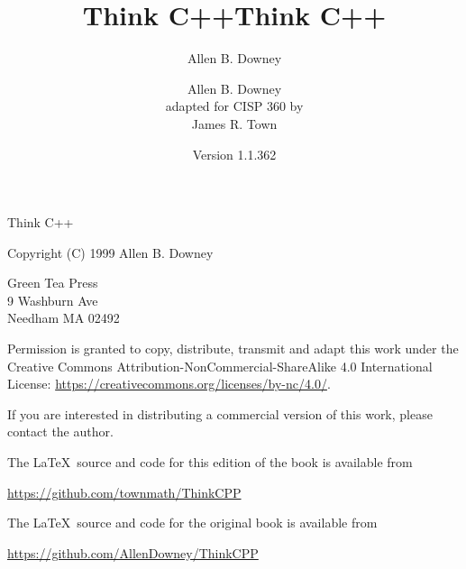 \documentclass{book}
\title{Think C++}
\author{Allen B. Downey}
\date{}
\begin{document}
\title {Think C++}
\author {Allen B. Downey \\ adapted for CISP 360 by \\ James R. Town}
\date {Version 1.1.362}
\maketitle

\vspace{2in}
\begin{center}
{\Large Think C++}

\vspace{0.25in}

Copyright (C) 1999  Allen B. Downey
\end{center}
\vspace{0.25in}

\begin{flushleft}
Green Tea Press       \\
9 Washburn Ave \\
Needham MA 02492
\end{flushleft}

Permission is granted to copy, distribute, transmit and adapt this
work under the Creative Commons Attribution-NonCommercial-ShareAlike 4.0
International License: \url{https://creativecommons.org/licenses/by-nc/4.0/}.

If you are interested in distributing a commercial version of this
work, please contact the author.

The \LaTeX\ source and code for this edition of the book is available from

\url{https://github.com/townmath/ThinkCPP}

The \LaTeX\ source and code for the original book is available from

\url{https://github.com/AllenDowney/ThinkCPP}

\frontmatter
\tableofcontents

\mainmatter
















\printindex
\end{document}
